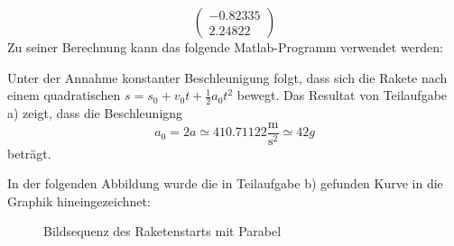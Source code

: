 \begin{loesung}
\begin{teilaufgaben}
\[\begin{pmatrix}
    -0.82335\\
     2.24822
\end{pmatrix}
\]
Zu seiner Berechnung kann das folgende Matlab-Programm verwendet werden:
\item
Unter der Annahme konstanter Beschleunigung folgt,  dass sich die
Rakete nach einem quadratischen $s=s_0+v_0t+\frac12a_0t^2$ bewegt.
Das Resultat von Teilaufgabe a) zeigt, dass die Beschleunigng
\[
a_0=2a\simeq410.71122\frac{\text{m}}{\text{s}^2}\simeq42g
\]
beträgt.
\end{teilaufgaben}
In der folgenden Abbildung wurde die in Teilaufgabe b) gefunden Kurve
in die Graphik hineingezeichnet:
\qedhere
\begin{figure}
\begin{center}
\end{center}
\caption{Bildsequenz des Raketenstarts mit Parabel\label{bildmitkurve}}
\end{figure}
\end{loesung}

